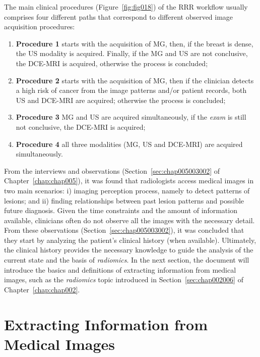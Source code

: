 \noindent
The main clinical procedures (Figure~\ref{fig:fig018}) of the \ac{RRR} workflow usually comprises four different paths that correspond to different observed image acquisition procedures:

\vspace{0.05mm}

\begin{enumerate}
\item \textbf{Procedure 1} starts with the acquisition of \ac{MG}, then, if the breast is dense, the \ac{US} modality is acquired. Finally, if the \ac{MG} and \ac{US} are not conclusive, the \ac{DCE}-\ac{MRI} is acquired, otherwise the process is concluded;
\item \textbf{Procedure 2} starts with the acquisition of \ac{MG}, then if the clinician detects a high risk of cancer from the image patterns and/or patient records, both \ac{US} and \ac{DCE}-\ac{MRI} are acquired; otherwise the process is concluded;
\item \textbf{Procedure 3} \ac{MG} and \ac{US} are acquired simultaneously, if the {\it exam} is still not conclusive, the \ac{DCE}-\ac{MRI} is acquired;
\item \textbf{Procedure 4} all three modalities (\ac{MG}, \ac{US} and \ac{DCE}-\ac{MRI}) are acquired simultaneously.
\end{enumerate}

From the interviews and observations (Section~\ref{sec:chap005003002} of Chapter~\ref{chap:chap005}), it was found that radiologists access medical images in two main scenarios:
i) imaging perception process, namely to detect patterns of lesions;
and ii) finding relationships between past lesion patterns and possible future diagnosis.
Given the time constraints and the amount of information available, clinicians often do not observe all the images with the necessary detail.
From these observations (Section~\ref{sec:chap005003002}), it was concluded that they start by analyzing the patient's clinical history (when available).
Ultimately, the clinical history provides the necessary knowledge to guide the analysis of the current state and the basis of {\it radiomics}.
In the next section, the document will introduce the basics and definitions of extracting information from medical images, such as the {\it radiomics} topic introduced in Section~\ref{sec:chap002006} of Chapter~\ref{chap:chap002}.

\section{Extracting Information from Medical Images}
\label{sec:app001006}

